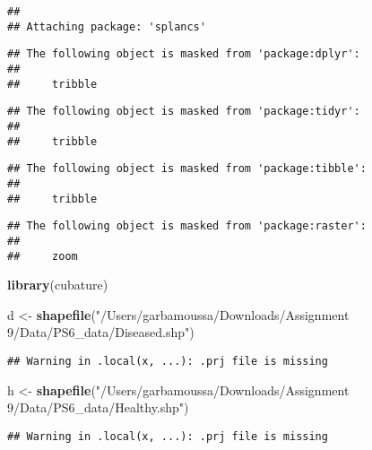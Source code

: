 \documentclass[]{article}
\newenvironment{Shaded}{\begin{snugshade}}{\end{snugshade}}
\newcommand{\KeywordTok}[1]{\textcolor[rgb]{0.13,0.29,0.53}{\textbf{#1}}}
\newcommand{\NormalTok}[1]{#1}
\newcommand{\StringTok}[1]{\textcolor[rgb]{0.31,0.60,0.02}{#1}}
\begin{document}
\begin{verbatim}
## 
## Attaching package: 'splancs'
\end{verbatim}

\begin{verbatim}
## The following object is masked from 'package:dplyr':
## 
##     tribble
\end{verbatim}

\begin{verbatim}
## The following object is masked from 'package:tidyr':
## 
##     tribble
\end{verbatim}

\begin{verbatim}
## The following object is masked from 'package:tibble':
## 
##     tribble
\end{verbatim}

\begin{verbatim}
## The following object is masked from 'package:raster':
## 
##     zoom
\end{verbatim}

\begin{Shaded}
\begin{Highlighting}[]
\KeywordTok{library}\NormalTok{(cubature)}
\end{Highlighting}
\end{Shaded}

\begin{Shaded}
\begin{Highlighting}[]
\NormalTok{d <-}\StringTok{ }\KeywordTok{shapefile}\NormalTok{(}\StringTok{"/Users/garbamoussa/Downloads/Assignment 9/Data/PS6_data/Diseased.shp"}\NormalTok{)}
\end{Highlighting}
\end{Shaded}

\begin{verbatim}
## Warning in .local(x, ...): .prj file is missing
\end{verbatim}

\begin{Shaded}
\begin{Highlighting}[]
\NormalTok{h <-}\StringTok{ }\KeywordTok{shapefile}\NormalTok{(}\StringTok{"/Users/garbamoussa/Downloads/Assignment 9/Data/PS6_data/Healthy.shp"}\NormalTok{)}
\end{Highlighting}
\end{Shaded}

\begin{verbatim}
## Warning in .local(x, ...): .prj file is missing
\end{verbatim}
\end{document}
